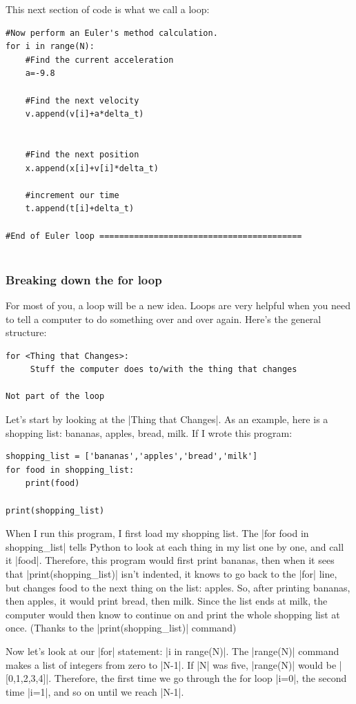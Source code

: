 \documentclass[twoside,11pt,ShortChapTitles]{BYUTextbook}
\begin{document}
This next section of code is what we call a loop:
\begin{lstlisting}
#Now perform an Euler's method calculation.
for i in range(N):
    #Find the current acceleration
    a=-9.8
    
    #Find the next velocity
    v.append(v[i]+a*delta_t)    
    
    
    #Find the next position
    x.append(x[i]+v[i]*delta_t)
    
    #increment our time
    t.append(t[i]+delta_t)

#End of Euler loop =========================================


\end{lstlisting}

\subsubsection{Breaking down the for loop}
For most of you, a loop will be a new idea. Loops are very helpful when you need to tell a computer to do something over and over again.  Here's the general structure:
\begin{lstlisting}
for <Thing that Changes>:
     Stuff the computer does to/with the thing that changes

Not part of the loop
\end{lstlisting}

Let's start by looking at the |Thing that Changes|.   As an example, here is a shopping list: bananas, apples, bread, milk.  If I wrote this program:
\begin{lstlisting}
shopping_list = ['bananas','apples','bread','milk']
for food in shopping_list:
    print(food)

print(shopping_list)
\end{lstlisting}
When I run this program, I first load my shopping list.  The |for food in shopping_list| tells Python to look at each thing in my list one by one, and call it |food|.  Therefore, this program would first print bananas, then when it sees that |print(shopping_list)| isn't indented, it knows to go back to the |for| line, but changes food to the next thing on the list: apples.  So, after printing bananas, then apples, it would print bread, then milk.  Since the list ends at milk, the computer would then know to continue on and print the whole shopping list at once. (Thanks to the |print(shopping_list)| command)

Now let's look at our |for| statement: |i in range(N)|.  The |range(N)| command makes a list of integers from zero to |N-1|.  If |N| was five, |range(N)| would be |[0,1,2,3,4]|.  Therefore, the first time we go through the for loop |i=0|, the second time |i=1|, and so on until we reach |N-1|.
\end{document}
